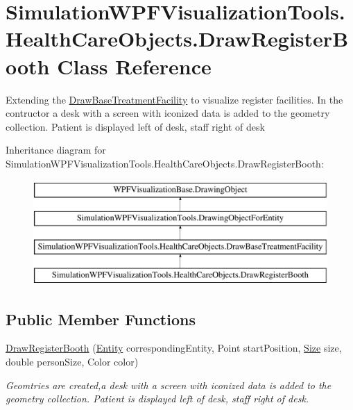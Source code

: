 \hypertarget{class_simulation_w_p_f_visualization_tools_1_1_health_care_objects_1_1_draw_register_booth}{}\section{Simulation\+W\+P\+F\+Visualization\+Tools.\+Health\+Care\+Objects.\+Draw\+Register\+Booth Class Reference}
\label{class_simulation_w_p_f_visualization_tools_1_1_health_care_objects_1_1_draw_register_booth}


Extending the \hyperlink{class_simulation_w_p_f_visualization_tools_1_1_health_care_objects_1_1_draw_base_treatment_facility}{Draw\+Base\+Treatment\+Facility} to visualize register facilities. In the contructor a desk with a screen with iconized data is added to the geometry collection. Patient is displayed left of desk, staff right of desk  


Inheritance diagram for Simulation\+W\+P\+F\+Visualization\+Tools.\+Health\+Care\+Objects.\+Draw\+Register\+Booth\+:\begin{figure}[H]
\begin{center}
\leavevmode
\includegraphics[height=4.000000cm]{class_simulation_w_p_f_visualization_tools_1_1_health_care_objects_1_1_draw_register_booth}
\end{center}
\end{figure}
\subsection*{Public Member Functions}
\begin{DoxyCompactItemize}
\item 
\hyperlink{class_simulation_w_p_f_visualization_tools_1_1_health_care_objects_1_1_draw_register_booth_afbb5b546bd3e1a4d3dd9ba2b623eb880}{Draw\+Register\+Booth} (\hyperlink{class_simulation_core_1_1_h_c_c_m_elements_1_1_entity}{Entity} corresponding\+Entity, Point start\+Position, \hyperlink{class_simulation_w_p_f_visualization_tools_1_1_health_care_objects_1_1_draw_base_treatment_facility_a83f48a13fa5f4f714e22088818f2038a}{Size} size, double person\+Size, Color color)
\begin{DoxyCompactList}\small\item\em Geomtries are created,a desk with a screen with iconized data is added to the geometry collection. Patient is displayed left of desk, staff right of desk. \end{DoxyCompactList}\end{DoxyCompactItemize}
